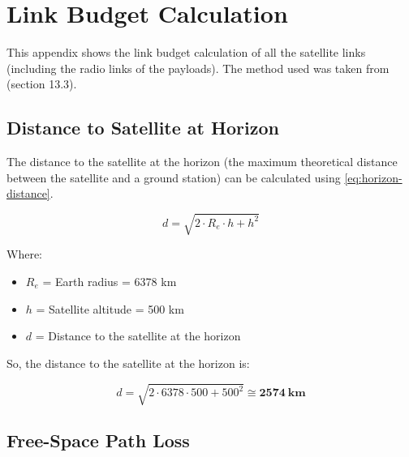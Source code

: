%
%
%
%
%

%
%
%
%
%
%

\chapter{Link Budget Calculation} \label{anx:link-budget}

This appendix shows the link budget calculation of all the satellite links (including the radio links of the payloads). The method used was taken from \cite{larson2005} (section 13.3).

\section{Distance to Satellite at Horizon}

The distance to the satellite at the horizon (the maximum theoretical distance between the satellite and a ground station) can be calculated using \autoref{eq:horizon-distance}.

\begin{equation} \label{eq:horizon-distance}
d = \sqrt{2\cdot R_{e}\cdot h + h^{2}}
\end{equation}

Where:

\begin{itemize}
    \item $R_{e}$ = Earth radius = 6378 km
    \item $h$ = Satellite altitude = 500 km
    \item $d$ = Distance to the satellite at the horizon
\end{itemize}

So, the distance to the satellite at the horizon is:

\begin{equation} \label{eq:horizon-distance-result}
d = \sqrt{2\cdot 6378\cdot 500 + 500^{2}} \cong \mathbf{2574\ km}
\end{equation}

\section{Free-Space Path Loss}

